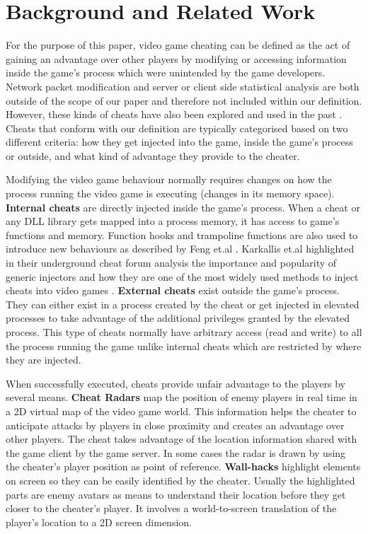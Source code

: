 


\section{Background and Related Work}
\label{sec:Background}

For the purpose of this paper, video game cheating can be defined as the act of gaining an advantage over other players by modifying or accessing information inside the game's process which were unintended by the game developers. Network packet modification and server or client side statistical analysis are both outside of the scope of our paper and therefore not included within our definition. However, these kinds of cheats have also been explored and used in the past \cite{BURSZTEIN2011OPENC,BURSZTEIN2016IAM,Lehtonen2020}. Cheats that conform with our definition are typically categorised based on two different criteria: how they get injected into the game, inside the game's process or outside, and what kind of advantage they provide to the cheater. 



Modifying the video game behaviour normally requires changes on how the process running the video game is executing (changes in its memory space). \textbf{Internal cheats} are directly injected inside the game's process. When a cheat or any DLL library gets mapped into a process memory, it has access to game's functions and memory. Function hooks and trampoline functions are also used to introduce new behaviours as described by Feng et.al \cite{FengStealthMeasurements}. Karkallis et.al highlighted in their underground cheat forum analysis the importance and popularity of generic injectors and how they are one of the most widely used methods to inject cheats into video games \cite{DetectingGameInjectors}. \textbf{External cheats} exist outside the game's process. They can either exist in a process created by the cheat or get injected in elevated processes to take advantage of the additional privileges granted by the elevated process. This type of cheats normally have arbitrary access (read and write) to all the process running the game unlike internal cheats which are restricted by where they are injected.

When successfully executed, cheats provide unfair advantage to the players by several means. \textbf{Cheat Radars} map the position of enemy players in real time in a 2D virtual map of the video game world. This information helps the cheater to anticipate attacks by players in close proximity and creates an advantage over other players. The cheat takes advantage of the location information shared with the game client by the game server. In some cases the radar is drawn by using the cheater’s player position as point of reference. \textbf{Wall-hacks} highlight elements on screen so they can be easily identified by the cheater. Usually the highlighted parts are enemy avatars as means to understand their location before they get closer to the cheater's player. It involves a world-to-screen translation of the player's location to a 2D screen dimension.

